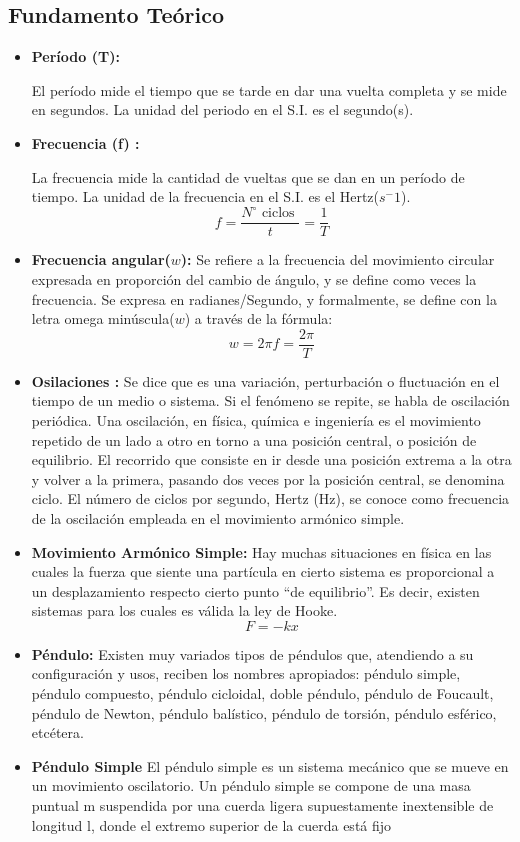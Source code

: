 \documentclass[10pt]{article}
\begin{document}
\subsection{Fundamento Teórico}
\begin{itemize}
    \item \textbf{Período (T):}

El período mide el tiempo que se tarde en dar una vuelta completa y se mide en segundos.
La unidad del periodo en el S.I. es el segundo(s). 
    \item \textbf{Frecuencia (f) :}
    
    La frecuencia mide la cantidad de vueltas que se dan en un período de tiempo. La unidad de
la frecuencia en el S.I. es el Hertz($s^-1$). 
\begin{equation*}
    f=\dfrac{N^{\circ} \text { ciclos }}{t}=\dfrac{1}{T}    
\end{equation*}
    \item \textbf{Frecuencia angular($w$):}
Se refiere a la frecuencia del movimiento circular expresada en proporción del cambio de
ángulo, y se define como veces la frecuencia. Se expresa en radianes/Segundo, y formalmente,
se define con la letra omega minúscula($w$) a través de la fórmula: 
    \begin{equation*}
        w=2\pi f=\dfrac{2\pi}T
    \end{equation*}
    \item \textbf{Osilaciones :}
    Se dice que es una variación, perturbación o fluctuación en el tiempo de un medio o sistema. Si
el fenómeno se repite, se habla de oscilación periódica.
Una oscilación, en física, química e ingeniería es el movimiento repetido de un lado a otro en
torno a una posición central, o posición de equilibrio. El recorrido que consiste en ir desde una
posición extrema a la otra y volver a la primera, pasando dos veces por la posición central, se
denomina ciclo. El número de ciclos por segundo, Hertz (Hz), se conoce como frecuencia de la
oscilación empleada en el movimiento armónico simple.
    \item \textbf{Movimiento Armónico Simple:}
Hay muchas situaciones en física en las cuales la fuerza que siente una partícula en cierto
sistema es proporcional a un desplazamiento respecto cierto punto “de equilibrio”. Es decir,
existen sistemas para los cuales es válida la ley de Hooke.
\begin{equation*}
    F = -kx
\end{equation*}
    \item \textbf{Péndulo:}
Existen muy variados tipos de péndulos que, atendiendo a su configuración y usos,
reciben los nombres apropiados: péndulo simple, péndulo compuesto, péndulo cicloidal,
doble péndulo, péndulo de Foucault, péndulo de Newton, péndulo balístico, péndulo de
torsión, péndulo esférico, etcétera.
    \item \textbf{Péndulo Simple}
El péndulo simple es un sistema mecánico que se mueve en un movimiento oscilatorio.
Un péndulo simple se compone de una masa puntual m suspendida por una cuerda
ligera supuestamente inextensible de longitud l, donde el extremo superior de la cuerda
está fijo
\end{itemize}
\end{document}
